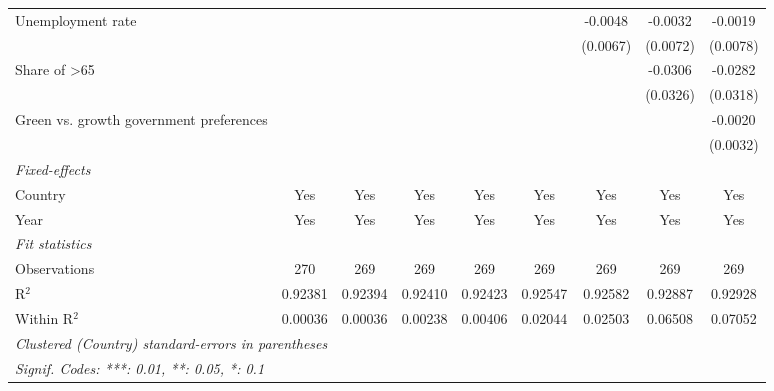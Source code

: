 \begin{table}[htbp]
\begin{tabular}{lcccccccc}
      Unemployment rate                                                 &          &          &          &          &          & -0.0048  & -0.0032  & -0.0019\\   
                                                                        &          &          &          &          &          & (0.0067) & (0.0072) & (0.0078)\\   
      Share of >65                                                      &          &          &          &          &          &          & -0.0306  & -0.0282\\   
                                                                        &          &          &          &          &          &          & (0.0326) & (0.0318)\\   
      Green vs. growth government preferences                           &          &          &          &          &          &          &          & -0.0020\\   
                                                                        &          &          &          &          &          &          &          & (0.0032)\\   
      \midrule
      \emph{Fixed-effects}\\
      Country                                                           & Yes      & Yes      & Yes      & Yes      & Yes      & Yes      & Yes      & Yes\\  
      Year                                                              & Yes      & Yes      & Yes      & Yes      & Yes      & Yes      & Yes      & Yes\\  
      \midrule
      \emph{Fit statistics}\\
      Observations                                                      & 270      & 269      & 269      & 269      & 269      & 269      & 269      & 269\\  
      R$^2$                                                             & 0.92381  & 0.92394  & 0.92410  & 0.92423  & 0.92547  & 0.92582  & 0.92887  & 0.92928\\  
      Within R$^2$                                                      & 0.00036  & 0.00036  & 0.00238  & 0.00406  & 0.02044  & 0.02503  & 0.06508  & 0.07052\\  
      \midrule \midrule
      \multicolumn{9}{l}{\emph{Clustered (Country) standard-errors in parentheses}}\\
      \multicolumn{9}{l}{\emph{Signif. Codes: ***: 0.01, **: 0.05, *: 0.1}}\\
   \end{tabular}
\end{table}


